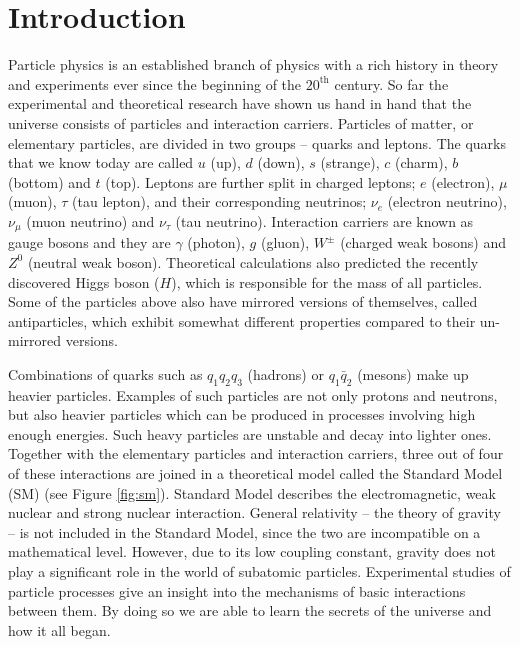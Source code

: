 \chapter{Introduction}
\pagestyle{plain}
Particle physics is an established branch of physics with a rich history in theory and experiments ever since the beginning of the $20^{\mathrm{th}}$ century. So far the experimental and theoretical research have shown us hand in hand that the universe consists of particles and interaction carriers. Particles of matter, or elementary particles, are divided in two groups -- quarks and leptons. The quarks that we know today are called $u$ (up), $d$ (down), $s$ (strange), $c$ (charm), $b$ (bottom) and $t$ (top). Leptons are further split in charged leptons; $e$ (electron), $\mu$ (muon), $\tau$ (tau lepton), and their corresponding neutrinos; $\nu_e$ (electron neutrino), $\nu_\mu$ (muon neutrino) and $\nu_\tau$ (tau neutrino). Interaction carriers are known as gauge bosons and they are $\gamma$ (photon), $g$ (gluon), $W^\pm$ (charged weak bosons) and $Z^0$ (neutral weak boson). Theoretical calculations also predicted the recently discovered Higgs boson ($H$), which is responsible for the mass of all particles. Some of the particles above also have mirrored versions of themselves, called antiparticles, which exhibit somewhat different properties compared to their un-mirrored versions.

Combinations of quarks such as $q_1 q_2 q_3$ (hadrons) or $q_1 \bar{q}_2$ (mesons) make up heavier particles. Examples of such particles are not only protons and neutrons, but also heavier particles which can be produced in processes involving high enough energies. Such heavy particles are unstable and decay into lighter ones. Together with the elementary particles and interaction carriers, three out of four of these interactions are joined in a theoretical model called the Standard Model (SM) \cite{GLASHOW1961579, PhysRevLett.19.1264, salam1994weak, GIMmech} (see Figure \ref{fig:sm}). Standard Model describes the electromagnetic, weak nuclear and strong nuclear interaction. General relativity -- the theory of gravity -- is not included in the Standard Model, since the two are incompatible on a mathematical level. However, due to its low coupling constant, gravity does not play a significant role in the world of subatomic particles. Experimental studies of particle processes give an insight into the mechanisms of basic interactions between them. By doing so we are able to learn the secrets of the universe and how it all began.


